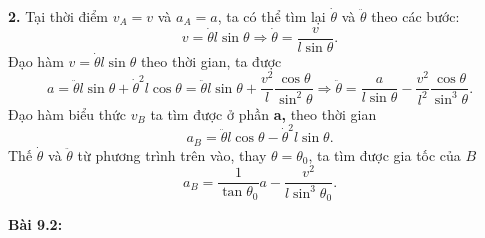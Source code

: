 \textbf{2.} Tại thời điểm $v_A=v$ và $a_A=a$, ta có thể tìm lại $\dot{\theta}$ và $\ddot{\theta}$ theo các bước:
\begin{equation} \label{eq1_rectangle_collision}
    v=\dot{\theta} l \sin \theta \Rightarrow \dot{\theta}= \dfrac{v}{l \sin \theta}.
\end{equation}
Đạo hàm $v=\dot{\theta} l \sin \theta$ theo thời gian, ta được
\begin{equation} \label{eq2_rectangle_collision}
    a = \ddot{\theta} l \sin \theta + \dot{\theta}^2 l \cos \theta = \ddot{\theta} l \sin \theta + \dfrac{v^2}{l} \dfrac{\cos \theta}{\sin^2 \theta} \Rightarrow \ddot{\theta}= \dfrac{a}{l \sin \theta} - \dfrac{v^2}{l^2} \dfrac{\cos \theta}{\sin^3 \theta}.
\end{equation}
Đạo hàm biểu thức $v_B$ ta tìm được ở phần \textbf{a,} theo thời gian
\begin{equation} \label{eq3_rectangle_collision}
    a_B = \ddot{\theta} l \cos \theta - \dot{\theta}^2 l \sin \theta.
\end{equation}
Thế $\dot{\theta}$ và $\ddot{\theta}$ từ phương trình trên vào, thay $\theta=\theta_0$, ta tìm được gia tốc của $B$
\begin{equation} \label{eq4_rectangle_collision}
    a_B = \dfrac{1}{\tan \theta_0} a - \dfrac{v^2}{l \sin^3 \theta_0}.
\end{equation}


\textbf{Bài 9.2:}
